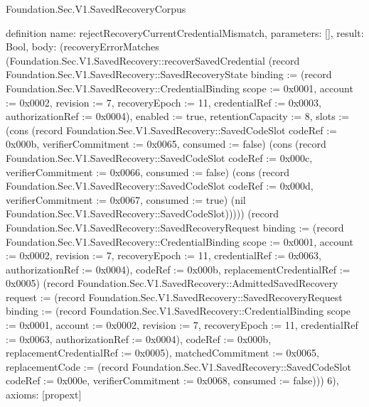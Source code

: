 \begin{lexlean}{Foundation.Sec.V1.SavedRecoveryCorpus}
\begin{semanticmodule}
definition{
  name: rejectRecoveryCurrentCredentialMismatch,
  parameters: [],
  result: Bool,
  body: (recoveryErrorMatches (Foundation.Sec.V1.SavedRecovery::recoverSavedCredential (record Foundation.Sec.V1.SavedRecovery::SavedRecoveryState {binding := (record Foundation.Sec.V1.SavedRecovery::CredentialBinding {scope := 0x0001, account := 0x0002, revision := 7, recoveryEpoch := 11, credentialRef := 0x0003, authorizationRef := 0x0004}), enabled := true, retentionCapacity := 8, slots := (cons (record Foundation.Sec.V1.SavedRecovery::SavedCodeSlot {codeRef := 0x000b, verifierCommitment := 0x0065, consumed := false}) (cons (record Foundation.Sec.V1.SavedRecovery::SavedCodeSlot {codeRef := 0x000c, verifierCommitment := 0x0066, consumed := false}) (cons (record Foundation.Sec.V1.SavedRecovery::SavedCodeSlot {codeRef := 0x000d, verifierCommitment := 0x0067, consumed := true}) (nil Foundation.Sec.V1.SavedRecovery::SavedCodeSlot))))}) (record Foundation.Sec.V1.SavedRecovery::SavedRecoveryRequest {binding := (record Foundation.Sec.V1.SavedRecovery::CredentialBinding {scope := 0x0001, account := 0x0002, revision := 7, recoveryEpoch := 11, credentialRef := 0x0063, authorizationRef := 0x0004}), codeRef := 0x000b, replacementCredentialRef := 0x0005}) (record Foundation.Sec.V1.SavedRecovery::AdmittedSavedRecovery {request := (record Foundation.Sec.V1.SavedRecovery::SavedRecoveryRequest {binding := (record Foundation.Sec.V1.SavedRecovery::CredentialBinding {scope := 0x0001, account := 0x0002, revision := 7, recoveryEpoch := 11, credentialRef := 0x0063, authorizationRef := 0x0004}), codeRef := 0x000b, replacementCredentialRef := 0x0005}), matchedCommitment := 0x0065, replacementCode := (record Foundation.Sec.V1.SavedRecovery::SavedCodeSlot {codeRef := 0x000e, verifierCommitment := 0x0068, consumed := false})})) 6),
  axioms: [propext]
}


\end{semanticmodule}
\end{lexlean}
